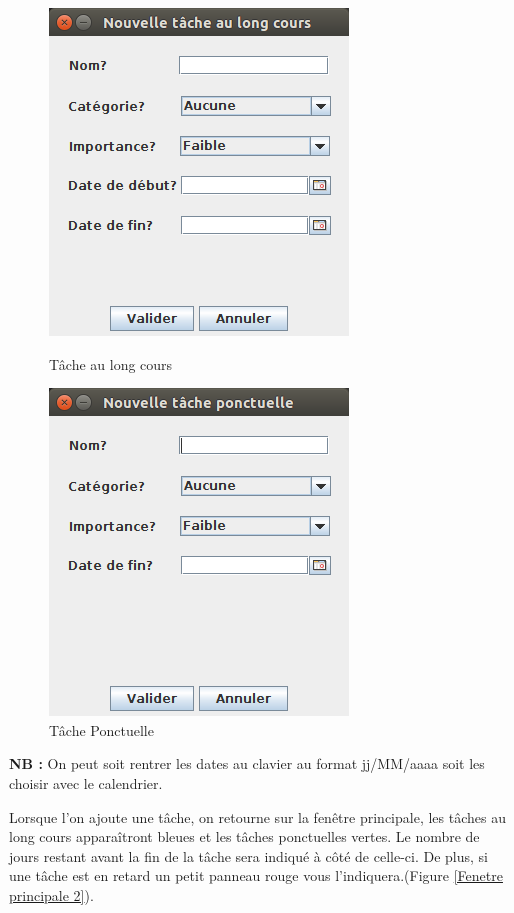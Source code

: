\documentclass{article}
\begin{document}
\begin{figure}[!ht]
	\centering
	\begin{minipage}[t]{5cm}
		\centering
		\includegraphics [scale=0.34]{images/NewTAsk1.png}
		\caption{Tâche au long cours}
		\label{Tâche au long cours}
	\end{minipage}
	\begin{minipage}[t]{5cm}
		\centering
		\includegraphics [scale=0.34]{images/NewTAsk2.png}
		\caption {Tâche Ponctuelle}
		\label{Tâche Ponctuelle}
	\end{minipage}
\end{figure}

\textbf{NB :} On peut soit rentrer les dates au clavier au format jj/MM/aaaa soit les choisir avec le calendrier.
\newline
\par
 Lorsque l'on ajoute une tâche, on retourne sur la fenêtre principale, les tâches au long cours apparaîtront bleues et les tâches ponctuelles vertes. Le nombre de jours restant avant la fin de la tâche sera indiqué à côté de celle-ci.
De plus, si une tâche est en retard un petit panneau rouge vous l'indiquera.(Figure \ref{Fenetre principale 2}).
\end{document}
